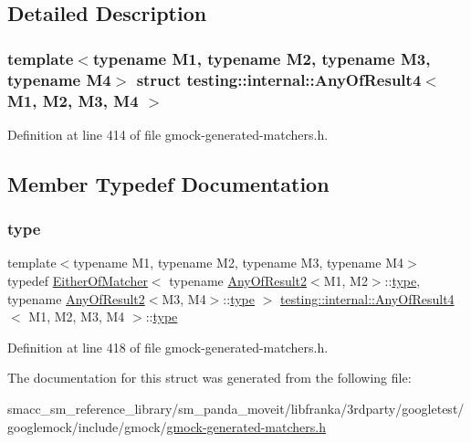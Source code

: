 \subsection{Detailed Description}
\subsubsection*{template$<$typename M1, typename M2, typename M3, typename M4$>$\newline
struct testing\+::internal\+::\+Any\+Of\+Result4$<$ M1, M2, M3, M4 $>$}



Definition at line 414 of file gmock-\/generated-\/matchers.\+h.



\subsection{Member Typedef Documentation}
\mbox{\label{structtesting_1_1internal_1_1AnyOfResult4_a4f3c9aebb4f7fc24287b59a0bdf1a4a6}} 
\subsubsection{\texorpdfstring{type}{type}}
{\footnotesize\ttfamily template$<$typename M1, typename M2, typename M3, typename M4$>$ \\
typedef \hyperlink{classtesting_1_1internal_1_1EitherOfMatcher}{Either\+Of\+Matcher}$<$ typename \hyperlink{structtesting_1_1internal_1_1AnyOfResult2}{Any\+Of\+Result2}$<$M1, M2$>$\+::\hyperlink{structtesting_1_1internal_1_1AnyOfResult4_a4f3c9aebb4f7fc24287b59a0bdf1a4a6}{type}, typename \hyperlink{structtesting_1_1internal_1_1AnyOfResult2}{Any\+Of\+Result2}$<$M3, M4$>$\+::\hyperlink{structtesting_1_1internal_1_1AnyOfResult4_a4f3c9aebb4f7fc24287b59a0bdf1a4a6}{type} $>$ \hyperlink{structtesting_1_1internal_1_1AnyOfResult4}{testing\+::internal\+::\+Any\+Of\+Result4}$<$ M1, M2, M3, M4 $>$\+::\hyperlink{structtesting_1_1internal_1_1AnyOfResult4_a4f3c9aebb4f7fc24287b59a0bdf1a4a6}{type}}



Definition at line 418 of file gmock-\/generated-\/matchers.\+h.



The documentation for this struct was generated from the following file\+:\begin{DoxyCompactItemize}
\item 
smacc\+\_\+sm\+\_\+reference\+\_\+library/sm\+\_\+panda\+\_\+moveit/libfranka/3rdparty/googletest/googlemock/include/gmock/\hyperlink{gmock-generated-matchers_8h}{gmock-\/generated-\/matchers.\+h}\end{DoxyCompactItemize}
